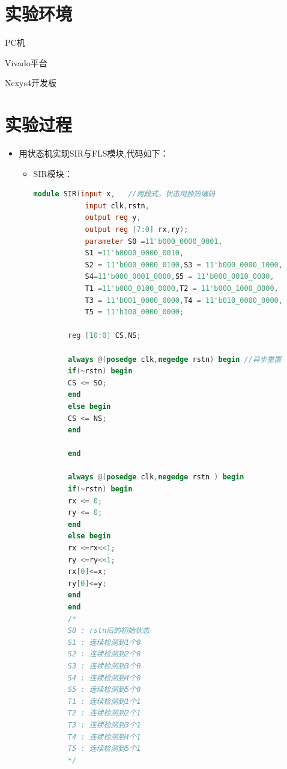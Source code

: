 \documentclass[UTF8,fontset=fandol]{ctexart}
\begin{document}
\section*{实验环境}
PC机

Vivado平台

Nexys4开发板
\section*{实验过程}
\begin{itemize}

    \item 用状态机实现SIR与FLS模块,代码如下：
    \begin{itemize}
        \item SIR模块：
        \begin{lstlisting}[language=Verilog,keywordstyle=\color{red!70}]
            module SIR(input x,   //两段式，状态用独热编码 
            input clk,rstn,
            output reg y,
            output reg [7:0] rx,ry);   
            parameter S0 =11'b000_0000_0001,
            S1 =11'b0000_0000_0010,
            S2 = 11'b000_0000_0100,S3 = 11'b000_0000_1000,
            S4=11'b000_0001_0000,S5 = 11'b000_0010_0000,
            T1 =11'b000_0100_0000,T2 = 11'b000_1000_0000,
            T3 = 11'b001_0000_0000,T4 = 11'b010_0000_0000,
            T5 = 11'b100_0000_0000; 
        
        reg [10:0] CS,NS;
        
        always @(posedge clk,negedge rstn) begin //异步重置
        if(~rstn) begin
        CS <= S0;          
        end 
        else begin
        CS <= NS;           
        end 
        
        end
        
        always @(posedge clk,negedge rstn ) begin
        if(~rstn) begin
        rx <= 0;
        ry <= 0;
        end
        else begin
        rx <=rx<<1;
        ry <=ry<<1;
        rx[0]<=x;
        ry[0]<=y;
        end  
        end
        /*
        S0 : rstn后的初始状态
        S1 : 连续检测到1个0
        S2 : 连续检测到2个0
        S3 : 连续检测到3个0
        S4 : 连续检测到4个0
        S5 : 连续检测到5个0
        T1 : 连续检测到1个1
        T2 : 连续检测到2个1
        T3 : 连续检测到3个1
        T4 : 连续检测到4个1
        T5 : 连续检测到5个1
        */
        

\end{lstlisting}
\end{itemize}
\end{itemize}
\end{document}
